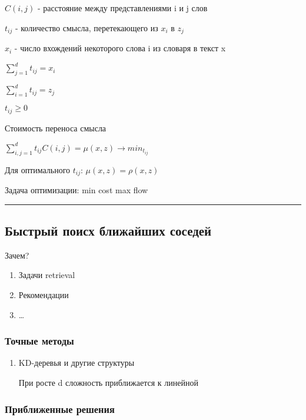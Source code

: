 \documentclass[a4paper, 12pt]{article}
\begin{document}
$C(i, j)$ - расстояние между представлениями i и j слов

$t_{ij}$ - количество смысла, перетекающего из $x_i$ в $z_j$

$x_i$ - число вхождений некоторого слова i из словаря в текст x

$\sum_{j = 1}^d t_{ij} = x_i$

$\sum_{i = 1}^d t_{ij} = z_j$

$t_{ij} \geq 0$

Стоимость переноса смысла

$\sum_{i, j = 1}^d t_{ij}C(i, j) = \mu(x, z) 
\rightarrow min_{t_{ij}}$

Для оптимального $t_{ij}$: $\mu(x, z) = \rho(x, z)$

Задача оптимизации: min cost max flow

\rule{\linewidth}{0.5pt}

\subsection{Быстрый поисх ближайших соседей}

Зачем?

\begin{enumerate}
    \item Задачи retrieval
    \item Рекомендации
    \item \dots
\end{enumerate}

\subsubsection{Точные методы}

\begin{enumerate}
    \item KD-деревья и другие структуры
    
    При росте d сложность приближается к линейной
\end{enumerate}

\subsubsection{Приближенные решения}
\end{document}
